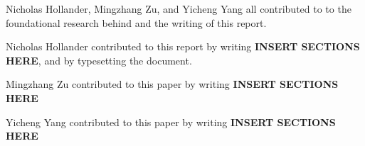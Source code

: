 \par Nicholas Hollander, Mingzhang Zu, and Yicheng Yang all contributed to to the foundational research behind and the writing of this report.

\par Nicholas Hollander contributed to this report by writing {\bf INSERT SECTIONS HERE}, and by typesetting the document.

\par Mingzhang Zu contributed to this paper by writing {\bf INSERT SECTIONS HERE}

\par Yicheng Yang contributed to this paper by writing {\bf INSERT SECTIONS HERE}
